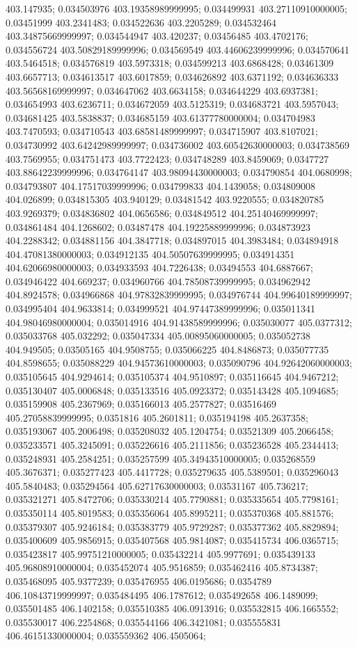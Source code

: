 403.147935; 0.034503976 403.19358989999995; 0.034499931 403.27110910000005; 0.03451999 403.2341483; 0.034522636 403.2205289; 0.034532464 403.34875669999997; 0.034544947 403.420237; 0.03456485 403.4702176; 0.034556724 403.50829189999996; 0.034569549 403.44606239999996; 0.034570641 403.5464518; 0.034576819 403.5973318; 0.034599213 403.6868428; 0.03461309 403.6657713; 0.034613517 403.6017859; 0.034626892 403.6371192; 0.034636333 403.56568169999997; 0.034647062 403.6634158; 0.034644229 403.6937381; 0.034654993 403.6236711; 0.034672059 403.5125319; 0.034683721 403.5957043; 0.034681425 403.5838837; 0.034685159 403.61377780000004; 0.034704983 403.7470593; 0.034710543 403.68581489999997; 0.034715907 403.8107021; 0.034730992 403.64242989999997; 0.034736002 403.60542630000003; 0.034738569 403.7569955; 0.034751473 403.7722423; 0.034748289 403.8459069; 0.0347727 403.88642239999996; 0.034764147 403.98094430000003; 0.034790854 404.0680998; 0.034793807 404.17517039999996; 0.034799833 404.1439058; 0.034809008 404.026899; 0.034815305 403.940129; 0.03481542 403.9220555; 0.034820785 403.9269379; 0.034836802 404.0656586; 0.034849512 404.25140469999997; 0.034861484 404.1268602; 0.03487478 404.19225889999996; 0.034873923 404.2288342; 0.034881156 404.3847718; 0.034897015 404.3983484; 0.034894918 404.47081380000003; 0.034912135 404.50507639999995; 0.034914351 404.62066980000003; 0.034933593 404.7226438; 0.03494553 404.6887667; 0.034946422 404.669237; 0.034960766 404.78508739999995; 0.034962942 404.8924578; 0.034966868 404.97832839999995; 0.034976744 404.99640189999997; 0.034995404 404.9633814; 0.034999521 404.97447389999996; 0.035011341 404.98046980000004; 0.035014916 404.91438589999996; 0.035030077 405.0377312; 0.035033768 405.032292; 0.035047334 405.00895060000005; 0.035052738 404.949505; 0.03505165 404.9508755; 0.035066225 404.8486873; 0.035077735 404.8598655; 0.035088229 404.94573610000003; 0.035090796 404.92642060000003; 0.035105645 404.9294614; 0.035105374 404.9510897; 0.035116645 404.9467212; 0.035130407 405.0006848; 0.035133516 405.0923372; 0.035143428 405.1094685; 0.035159908 405.2367969; 0.035166013 405.2577827; 0.03516469 405.27058839999995; 0.0351816 405.2601811; 0.035194198 405.2637358; 0.035193067 405.2006498; 0.035208032 405.1204754; 0.03521309 405.2066458; 0.035233571 405.3245091; 0.035226616 405.2111856; 0.035236528 405.2344413; 0.035248931 405.2584251; 0.035257599 405.34943510000005; 0.035268559 405.3676371; 0.035277423 405.4417728; 0.035279635 405.5389501; 0.035296043 405.5840483; 0.035294564 405.62717630000003; 0.03531167 405.736217; 0.035321271 405.8472706; 0.035330214 405.7790881; 0.035335654 405.7798161; 0.035350114 405.8019583; 0.035356064 405.8995211; 0.035370368 405.881576; 0.035379307 405.9246184; 0.035383779 405.9729287; 0.035377362 405.8829894; 0.035400609 405.9856915; 0.035407568 405.9814087; 0.035415734 406.0365715; 0.035423817 405.99751210000005; 0.035432214 405.9977691; 0.035439133 405.96808910000004; 0.035452074 405.9516859; 0.035462416 405.8734387; 0.035468095 405.9377239; 0.035476955 406.0195686; 0.0354789 406.10843719999997; 0.035484495 406.1787612; 0.035492658 406.1489099; 0.035501485 406.1402158; 0.035510385 406.0913916; 0.035532815 406.1665552; 0.035530017 406.2254868; 0.035544166 406.3421081; 0.035555831 406.46151330000004; 0.035559362 406.4505064; 